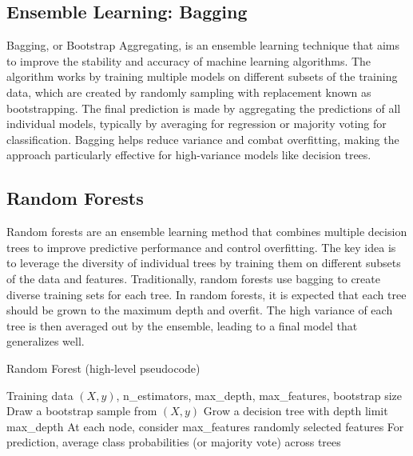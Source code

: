 \documentclass[conference]{IEEEtran}
\begin{document}
\subsection{Ensemble Learning: Bagging}
Bagging, or Bootstrap Aggregating, is an ensemble learning technique that aims to improve the stability and accuracy of machine learning algorithms.
 The algorithm works by training multiple models on different subsets of the training data, which are created by randomly sampling with 
 replacement known as bootstrapping. The final prediction is made by aggregating the predictions of all individual models, typically by 
 averaging for regression or majority voting for classification. Bagging helps reduce variance and combat overfitting, making the approach 
 particularly effective for high-variance models like decision trees.

\subsection{Random Forests}

Random forests are an ensemble learning method that combines multiple decision trees to improve predictive performance and control 
overfitting. The key idea is to leverage the diversity of individual trees by training them on different subsets of the data and features. Traditionally,
random forests use bagging to create diverse training sets for each tree. In random forests, it is expected that each tree should be grown
to the maximum depth and overfit. The high variance of each tree is then averaged out by the ensemble, leading to a final model that generalizes well.

\begin{algorithm}[H]
\caption{Random Forest (high-level pseudocode)}
\begin{algorithmic}[1]
\REQUIRE Training data $(X, y)$, n\_estimators, max\_depth, max\_features, bootstrap size
  \STATE Draw a bootstrap sample from $(X, y)$  %
  \STATE Grow a decision tree with depth limit max\_depth
  \STATE At each node, consider max\_features randomly selected features
\ENDFOR
\STATE For prediction, average class probabilities (or majority vote) across trees
\end{algorithmic}
\end{algorithm}
\end{document}
